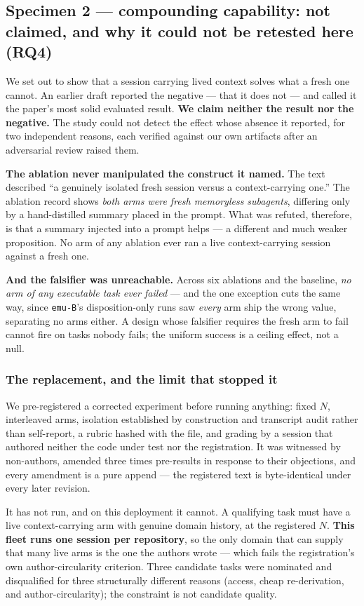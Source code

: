\documentclass[10pt,conference]{IEEEtran}   %
\begin{document}
\subsection{Specimen 2 --- compounding capability: not claimed, and why it could not be retested here (RQ4)}
\label{sec:rq4}
We set out to show that a session carrying lived context solves what a fresh one cannot. An earlier
draft reported the negative --- that it does not --- and called it the paper's most solid evaluated
result. \textbf{We claim neither the result nor the negative.} The study could not detect the effect
whose absence it reported, for two independent reasons, each verified against our own artifacts after
an adversarial review raised them.

\textbf{The ablation never manipulated the construct it named.} The text described ``a genuinely
isolated fresh session versus a context-carrying one.'' The ablation record shows \emph{both arms
were fresh memoryless subagents}, differing only by a hand-distilled summary placed in the prompt.
What was refuted, therefore, is that a summary injected into a prompt helps --- a different and much
weaker proposition. No arm of any ablation ever ran a live context-carrying session against a fresh
one.

\textbf{And the falsifier was unreachable.} Across six ablations and the baseline, \emph{no arm of
any executable task ever failed} --- and the one exception cuts the same way, since
\texttt{emu-B}'s disposition-only runs saw \emph{every} arm ship the wrong value, separating no arms
either. A design whose falsifier requires the fresh arm to fail cannot fire on tasks
nobody fails; the uniform success is a ceiling effect, not a null.

\subsubsection*{The replacement, and the limit that stopped it}
We pre-registered a corrected experiment before running anything: fixed $N$, interleaved arms,
isolation established by construction and transcript audit rather than self-report, a rubric hashed
with the file, and grading by a session that authored neither the code under test nor the
registration. It was witnessed by non-authors, amended three times pre-results in response to their
objections, and every amendment is a pure append --- the registered text is byte-identical under
every later revision.

It has not run, and on this deployment it cannot. A qualifying task must have a live
context-carrying arm with genuine domain history, at the registered $N$. \textbf{This fleet runs one
session per repository}, so the only domain that can supply that many live arms is the one the
authors wrote --- which fails the registration's own author-circularity criterion. Three candidate
tasks were nominated and disqualified for three structurally different reasons (access, cheap
re-derivation, and author-circularity); the constraint is not candidate quality.
\end{document}
